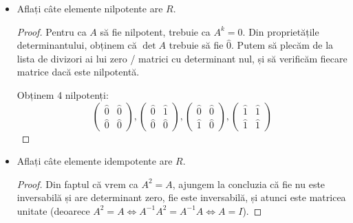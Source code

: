 \begin{exercise}[1.29]
\begin{itemize}
    \item Aflați câte elemente nilpotente are \(R\).
    \begin{proof}
    Pentru ca \(A\) să fie nilpotent, trebuie ca \(A^k = 0\). Din proprietățile determinantului, obținem că \(\det A\) trebuie să fie \(\widehat{0}\). Putem să plecăm de la lista de divizori ai lui zero / matrici cu determinant nul, și să verificăm fiecare matrice dacă este nilpotentă.
    
    Obținem 4 nilpotenți:
    \[
        \begin{pmatrix}
            \widehat{0} & \widehat{0} \\
            \widehat{0} & \widehat{0}
        \end{pmatrix},
        \begin{pmatrix}
            \widehat{0} & \widehat{1} \\
            \widehat{0} & \widehat{0}
        \end{pmatrix},
        \begin{pmatrix}
            \widehat{0} & \widehat{0} \\
            \widehat{1} & \widehat{0}
        \end{pmatrix},
        \begin{pmatrix}
            \widehat{1} & \widehat{1} \\
            \widehat{1} & \widehat{1}
        \end{pmatrix}
    \]
    \end{proof}
    
    \item Aflați câte elemente idempotente are \(R\).
    \begin{proof}
    Din faptul că vrem ca \(A^2 = A\), ajungem la concluzia că fie nu este inversabilă și are determinant zero, fie este inversabilă, și atunci este matricea unitate (deoarece \(A^2 = A \iff A^{-1} A^2 = A^{-1} A \iff A = I\)).
    

\end{proof}
\end{itemize}
\end{exercise}
